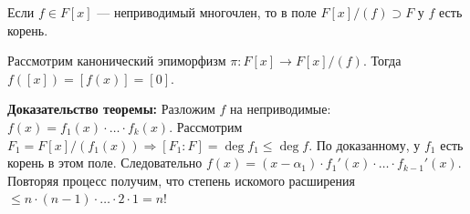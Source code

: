\par \Statement Если $f \in F[x]$ — неприводимый многочлен, то в поле $F[x]/(f) \supset F$ у
$f$ есть корень.
\par \Proof Рассмотрим канонический эпиморфизм $\pi: F[x] \rightarrow F[x]/(f)$. Тогда
$f([x])=[f(x)]=[0]$. \EndProof

\par \textbf{Доказательство теоремы:} \Proof Разложим $f$ на неприводимые: $f(x)=f_1(x)\cdot\ldots\cdot f_k(x)$. Рассмотрим $F_1=F[x]/(f_1(x)) \Rightarrow [F_1 : F]=\deg f_1 \leq \deg f$. По доказанному, у $f_1$ есть корень в этом поле. Следовательно $f(x)=(x-\alpha_1) \cdot f_1'(x)\cdot \ldots \cdot f_{k-1}'(x)$. Повторяя процесс получим, что степень искомого расширения $\leq n\cdot(n-1)\cdot\ldots\cdot 2 \cdot 1=n!$ \EndProof